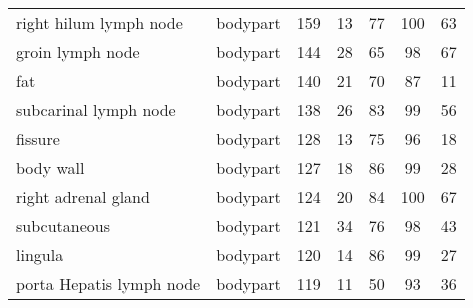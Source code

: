 \documentclass[runningheads]{llncs}
\begin{document}
\begin{table}[]
\begin{tabular}{p{3.6cm}cccccc}
		right hilum lymph node	&  bodypart	& 159	& 13	& 77	& 100	& 63 \\
		groin lymph node	&  bodypart	& 144	& 28	& 65	& 98	& 67 \\
		fat	&  bodypart	& 140	& 21	& 70	& 87	& 11 \\
		subcarinal lymph node	&  bodypart	& 138	& 26	& 83	& 99	& 56 \\
		fissure	&  bodypart	& 128	& 13	& 75	& 96	& 18 \\
		body wall	&  bodypart	& 127	& 18	& 86	& 99	& 28 \\
		right adrenal gland	&  bodypart	& 124	& 20	& 84	& 100	& 67 \\
		subcutaneous	&  bodypart	& 121	& 34	& 76	& 98	& 43 \\
		lingula	&  bodypart	& 120	& 14	& 86	& 99	& 27 \\
		porta Hepatis lymph node	&  bodypart	& 119	& 11	& 50	& 93	& 36 \\

		\hline
	\end{tabular}
	
	\label{tbl:acc_per_tag1}
\end{table}
\end{document}
